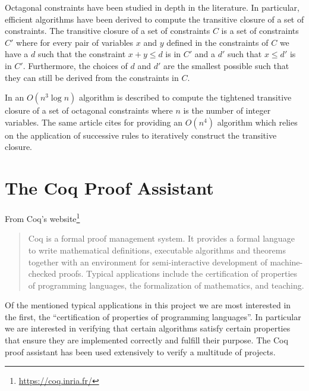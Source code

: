 Octagonal constraints have been studied in depth in the literature. In particular, efficient
algorithms \cite{HarveyStuckey,TransitiveClosure} have been derived to compute the transitive
closure of a set of constraints. The transitive closure of a set of constraints $C$ is a set 
of constraints $C'$ where for every pair of variables $x$ and $y$ defined in the constraints 
of $C$ we have a $d$ such that the constraint $x + y \le d$ is in $C'$ and a $d'$ such that 
$x \le d'$ is in $C'$. Furthermore, the choices of $d$ and $d'$ are the smallest possible 
such that they can still be derived from the constraints in $C$.

In \cite{TransitiveClosure} an $O(n^3\log{n})$ algorithm is described to compute the tightened 
transitive closure of a set of octagonal constraints where $n$ is the number of integer variables. The 
same article cites \cite{HarveyStuckey} for providing an $O(n^4)$ algorithm which relies on the 
application of successive rules to iteratively construct the transitive closure.

\section{The Coq Proof Assistant}
\label{cap:coq-proof-assistant}

From Coq's website\footnote{\url{https://coq.inria.fr/}}

\begin{quote}
    Coq is a formal proof management system. It provides a formal language to write mathematical
    definitions, executable algorithms and theorems together with an environment for semi-interactive
    development of machine-checked proofs. Typical applications include the certification of properties
    of programming languages, the formalization of mathematics, and teaching.
\end{quote}

Of the mentioned typical applications in this project we are most interested in 
the first, the ``certification of properties of programming languages''. In
particular we are interested in verifying that certain algorithms satisfy certain properties
that ensure they are implemented correctly and fulfill their purpose. The Coq proof assistant 
has been used extensively to verify a multitude of projects.

